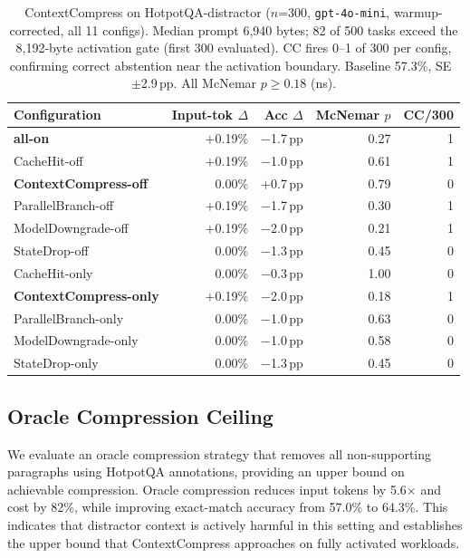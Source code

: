 \documentclass[sigconf,9pt]{acmart}
\begin{document}
\begin{table}[t]
\caption{ContextCompress on HotpotQA-distractor ($n$=300, \texttt{gpt-4o-mini},
warmup-corrected, all 11 configs). Median prompt 6,940 bytes; 82 of 500 tasks exceed
the 8,192-byte activation gate (first 300 evaluated). CC fires 0--1 of 300 per
config, confirming correct abstention near the activation boundary. Baseline 57.3\%,
SE~$\pm$2.9\,pp. All McNemar $p \geq 0.18$ (ns).}
\label{tab:hotpot-matrix}
\small
\begin{tabular}{lrrrr}
\toprule
Configuration & Input-tok $\Delta$ & Acc $\Delta$ & McNemar $p$ & CC/300 \\
\midrule
\textbf{all-on}              & $+$0.19\% & $-$1.7\,pp & 0.27 & 1 \\
CacheHit-off                 & $+$0.19\% & $-$1.0\,pp & 0.61 & 1 \\
\textbf{ContextCompress-off} & $\phantom{+}$0.00\% & $+$0.7\,pp & 0.79 & 0 \\
ParallelBranch-off           & $+$0.19\% & $-$1.7\,pp & 0.30 & 1 \\
ModelDowngrade-off           & $+$0.19\% & $-$2.0\,pp & 0.21 & 1 \\
StateDrop-off                & $\phantom{+}$0.00\% & $-$1.3\,pp & 0.45 & 0 \\
\midrule
CacheHit-only                & $\phantom{+}$0.00\% & $-$0.3\,pp & 1.00 & 0 \\
\textbf{ContextCompress-only}& $+$0.19\% & $-$2.0\,pp & 0.18 & 1 \\
ParallelBranch-only          & $\phantom{+}$0.00\% & $-$1.0\,pp & 0.63 & 0 \\
ModelDowngrade-only          & $\phantom{+}$0.00\% & $-$1.0\,pp & 0.58 & 0 \\
StateDrop-only               & $\phantom{+}$0.00\% & $-$1.3\,pp & 0.45 & 0 \\
\bottomrule
\end{tabular}
\end{table}

\subsection{Oracle Compression Ceiling}
\label{sec:eval-oracle}

We evaluate an oracle compression strategy that removes all non-supporting paragraphs
using HotpotQA annotations, providing an upper bound on achievable compression. Oracle
compression reduces input tokens by 5.6$\times$ and cost by 82\%, while improving
exact-match accuracy from 57.0\% to 64.3\%. This indicates that distractor context is
actively harmful in this setting and establishes the upper bound that ContextCompress
approaches on fully activated workloads.
\end{document}
